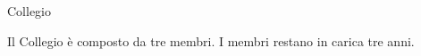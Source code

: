 \begin{capo}[id=cap002]{Collegio}
\begin{commi}
  \comma[id=com006] Il Collegio è composto da tre membri.
  \comma[id=com007] I membri restano in carica tre anni.
\end{commi}
\end{capo}
